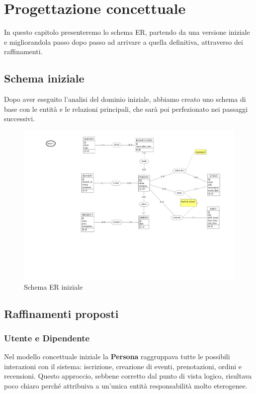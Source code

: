 \documentclass[a4paper,12pt]{report}
\begin{document}
\chapter{Progettazione concettuale}
In questo capitolo presenteremo lo schema ER, partendo da una
versione iniziale e migliorandola
passo dopo passo ad arrivare a quella definitiva, attraverso dei raffinamenti.

\section{Schema iniziale}
Dopo aver eseguito l'analisi del dominio iniziale, abbiamo creato uno
schema di base con
le entità e le relazioni principali, che sarà poi perfezionato nei
passaggi successivi.
\begin{figure}[H]
  \centering
  \includegraphics[width=\textwidth, trim=200pt 170pt 50pt 0pt,
  clip]{./schemas/base.pdf}
  \caption{Schema ER iniziale}
  \label{fig:schema-iniziale}
\end{figure}

\section{Raffinamenti proposti}
\subsection{Utente e Dipendente}
Nel modello concettuale iniziale la \textbf{Persona} raggruppava
tutte le possibili interazioni
con il sistema: iscrizione, creazione di eventi, prenotazioni, ordini
e recensioni. Questo
approccio, sebbene corretto dal punto di vista logico, risultava poco
chiaro perché attribuiva
a un'unica entità responsabilità molto eterogenee.
\end{document}
